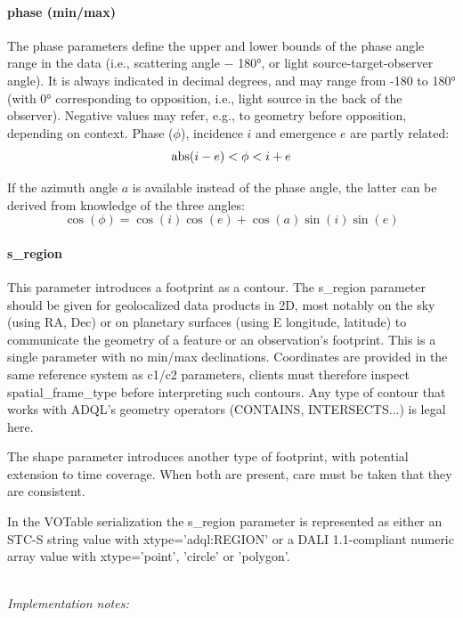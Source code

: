 \documentclass[11pt,a4paper]{ivoa}
\begin{document}
\paragraph{phase (min/max)}

The phase parameters define the upper and lower bounds of the phase
angle range in the data (i.e., scattering angle $-$ 180°, or light
source-target-observer angle). It is always indicated in decimal degrees,
and may range from -180 to 180° (with 0° corresponding to opposition,
i.e., light source in the back of the observer). Negative values may
refer, e.g., to geometry before opposition, depending on context.
Phase ($\phi$), incidence $i$ and emergence $e$ are partly related:
\begin{displaymath}
  {\rm abs}(i - e) < \phi < i + e
\end{displaymath}

If the azimuth angle $a$ is available instead of the phase angle,
the latter can be derived from knowledge of the three angles:
\begin{displaymath}
  \cos(\phi) = \cos(i) \cos(e) + \cos(a) \sin(i) \sin(e)
\end{displaymath}

\paragraph{s\_region}

This parameter introduces a footprint as a contour. The s\_region
parameter should be given for geolocalized data products in 2D, most
notably on the sky (using RA, Dec) or on planetary surfaces (using E
longitude, latitude) to communicate the geometry of a feature or an
observation's footprint. This is a single parameter with no min/max
declinations. Coordinates are provided in the same reference system as
c1/c2 parameters, clients must therefore inspect spatial\_frame\_type
before interpreting such contours. Any type of contour that works with
ADQL's geometry operators (CONTAINS, INTERSECTS...) is legal here.

The shape parameter introduces another type of footprint, with potential
extension to time coverage. When both are present, care must be taken
that they are consistent.

In the VOTable serialization the s\_region parameter is represented
as either an STC-S string value with xtype='adql:REGION' or a DALI
1.1-compliant numeric array value with xtype='point', 'circle' or
'polygon'.

\textbf{\\}
\emph{Implementation notes:}
\end{document}
